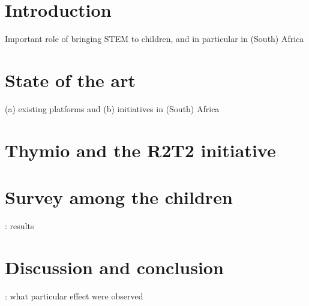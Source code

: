 \documentclass{intech-journal}
\begin{document}
\maketitle

\articleabstract{}
\keywords{}

\section{Introduction}
Important role of bringing STEM to children, and in particular in (South) Africa

\section{State of the art}
(a) existing platforms and (b) initiatives in (South) Africa

\section{Thymio and the R2T2 initiative}

\section{Survey among the children}: results

\section{Discussion and conclusion}: what particular effect were observed 


\begin{thebibliography}{500} %

\end{thebibliography}
\end{document}
